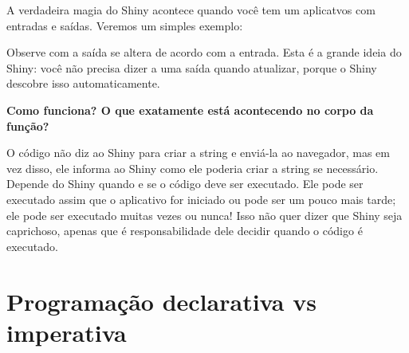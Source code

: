 \documentclass[
]{book}
\newenvironment{Shaded}{\begin{snugshade}}{\end{snugshade}}
\newcommand{\AttributeTok}[1]{\textcolor[rgb]{0.77,0.63,0.00}{#1}}
\newcommand{\ControlFlowTok}[1]{\textcolor[rgb]{0.13,0.29,0.53}{\textbf{#1}}}
\newcommand{\FunctionTok}[1]{\textcolor[rgb]{0.00,0.00,0.00}{#1}}
\newcommand{\NormalTok}[1]{#1}
\newcommand{\OtherTok}[1]{\textcolor[rgb]{0.56,0.35,0.01}{#1}}
\newcommand{\SpecialCharTok}[1]{\textcolor[rgb]{0.00,0.00,0.00}{#1}}
\newcommand{\StringTok}[1]{\textcolor[rgb]{0.31,0.60,0.02}{#1}}
\begin{document}
A verdadeira magia do Shiny acontece quando você tem um aplicatvos com entradas e saídas. Veremos um simples exemplo:

\begin{Shaded}
\end{Shaded}

Observe com a saída se altera de acordo com a entrada. Esta é a grande ideia do Shiny: você não precisa dizer a uma saída quando atualizar, porque o Shiny descobre isso automaticamente.

\textbf{Como funciona? O que exatamente está acontecendo no corpo da função?}

O código não diz ao Shiny para criar a string e enviá-la ao navegador, mas em vez disso, ele informa ao Shiny como ele poderia criar a string se necessário. Depende do Shiny quando e se o código deve ser executado. Ele pode ser executado assim que o aplicativo for iniciado ou pode ser um pouco mais tarde; ele pode ser executado muitas vezes ou nunca! Isso não quer dizer que Shiny seja caprichoso, apenas que é responsabilidade dele decidir quando o código é executado.

\hypertarget{programauxe7uxe3o-declarativa-vs-imperativa}{%
\section{\texorpdfstring{\textbf{Programação declarativa vs imperativa}}{Programação declarativa vs imperativa}}\label{programauxe7uxe3o-declarativa-vs-imperativa}}
\end{document}
